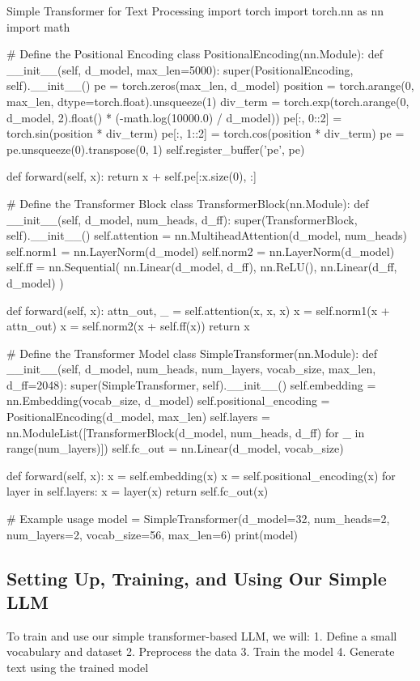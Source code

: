 \begin{codeonly}{Simple Transformer for Text Processing}
import torch
import torch.nn as nn
import math

# Define the Positional Encoding
class PositionalEncoding(nn.Module):
    def __init__(self, d_model, max_len=5000):
        super(PositionalEncoding, self).__init__()
        pe = torch.zeros(max_len, d_model)
        position = torch.arange(0, max_len, dtype=torch.float).unsqueeze(1)
        div_term = torch.exp(torch.arange(0, d_model, 2).float() * (-math.log(10000.0) / d_model))
        pe[:, 0::2] = torch.sin(position * div_term)
        pe[:, 1::2] = torch.cos(position * div_term)
        pe = pe.unsqueeze(0).transpose(0, 1)
        self.register_buffer('pe', pe)

    def forward(self, x):
        return x + self.pe[:x.size(0), :]

# Define the Transformer Block
class TransformerBlock(nn.Module):
    def __init__(self, d_model, num_heads, d_ff):
        super(TransformerBlock, self).__init__()
        self.attention = nn.MultiheadAttention(d_model, num_heads)
        self.norm1 = nn.LayerNorm(d_model)
        self.norm2 = nn.LayerNorm(d_model)
        self.ff = nn.Sequential(
            nn.Linear(d_model, d_ff),
            nn.ReLU(),
            nn.Linear(d_ff, d_model)
        )

    def forward(self, x):
        attn_out, _ = self.attention(x, x, x)
        x = self.norm1(x + attn_out)
        x = self.norm2(x + self.ff(x))
        return x

# Define the Transformer Model
class SimpleTransformer(nn.Module):
    def __init__(self, d_model, num_heads, num_layers, vocab_size, max_len, d_ff=2048):
        super(SimpleTransformer, self).__init__()
        self.embedding = nn.Embedding(vocab_size, d_model)
        self.positional_encoding = PositionalEncoding(d_model, max_len)
        self.layers = nn.ModuleList([TransformerBlock(d_model, num_heads, d_ff) for _ in range(num_layers)])
        self.fc_out = nn.Linear(d_model, vocab_size)

    def forward(self, x):
        x = self.embedding(x)
        x = self.positional_encoding(x)
        for layer in self.layers:
            x = layer(x)
        return self.fc_out(x)

# Example usage
model = SimpleTransformer(d_model=32, num_heads=2, num_layers=2, vocab_size=56, max_len=6)
print(model)
\end{codeonly}

\subsection{Setting Up, Training, and Using Our Simple LLM}
To train and use our simple transformer-based LLM, we will:
1. Define a small vocabulary and dataset
2. Preprocess the data
3. Train the model
4. Generate text using the trained model

